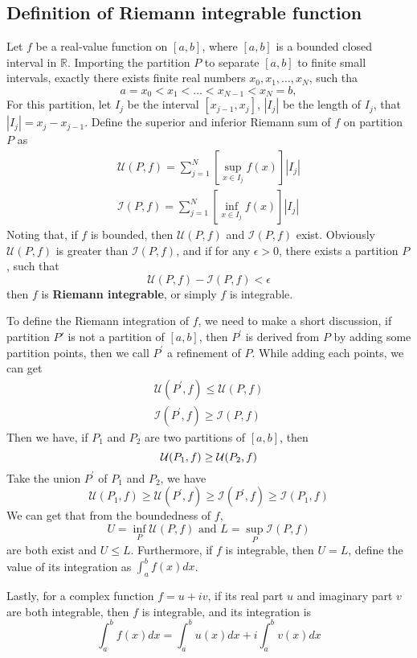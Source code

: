 \documentclass[a4paper]{article}
\numberwithin{equation}{subsection}
\begin{document}
\subsection{Definition of Riemann integrable function}
\par Let $f$ be a real-value function on $[a,b]$, where $[a,b]$ is a bounded closed interval in $\mathbb{R}$. Importing the partition $P$ to separate $[a,b]$ to finite small intervals, exactly there exists finite real numbers $x_0, x_1, \dots, x_N$, such tha
$$a=x_0 < x_1 < \dots < x_{N-1} < x_N=b,$$
For this partition, let $I_j$ be the interval $[x_{j-1},x_j]$, $|I_j|$ be the length of $I_j$, that $|I_j|=x_j-x_{j-1}$. Define the superior and inferior Riemann sum of $f$ on partition $P$ as
\begin{gather}
    \mathcal{U}(P, f) = \sum_{j=1}^N [\sup_{x \in I_j} f(x)]|I_j| \\
    \mathcal{I}(P, f) = \sum_{j=1}^N [\inf_{x \in I_j} f(x)]|I_j|
\end{gather}
Noting that, if $f$ is bounded, then $\mathcal{U}(P, f)$ and $\mathcal{I}(P, f)$ exist. Obviously $\mathcal{U}(P, f)$ is greater than $\mathcal{I}(P, f)$, and if for any $\epsilon>0$, there exists a partition $P$, such that
$$\mathcal{U}(P, f) - \mathcal{I}(P, f) < \epsilon$$
then $f$ is \textbf{Riemann integrable}, or simply $f$ is integrable.
\par To define the Riemann integration of $f$, we need to make a short discussion, if partition $P\prime$ is not a partition of $[a,b]$, then $P^\prime$ is derived from $P$ by adding some partition points, then we call $P^\prime$ a refinement of $P$. While adding each points, we can get
\begin{gather}
    \mathcal{U}(P^\prime, f)\leq\mathcal{U}(P, f) \\
    \mathcal{I}(P^\prime, f)\geq\mathcal{I}(P, f)
\end{gather}
Then we have, if $P_1$ and $P_2$ are two partitions of $[a,b]$, then
\begin{equation}
    \mathcal{U}(P_1, f) \geq \mathcal{U}(P_2, f) \\
\end{equation}
Take the union $P^\prime$ of $P_1$ and $P_2$, we have
\begin{equation}
    \mathcal{U}(P_1, f) \geq \mathcal{U}(P^\prime, f) \geq \mathcal{I}(P^\prime, f) \geq \mathcal{I}(P_1, f)
\end{equation}
We can get that from the boundedness of $f$,
\begin{equation}
    U=\inf_P\mathcal{U}(P, f) \text{ and } L=\sup_P\mathcal{I}(P, f)
\end{equation}
are both exist and $U \leq L$. Furthermore, if $f$ is integrable, then $U=L$, define the value of its integration as $\int_{a}^{b}f(x)dx$.
\par Lastly, for a complex function $f=u+iv$, if its real part $u$ and imaginary part $v$ are both integrable, then $f$ is integrable, and its integration is
\begin{equation}
    \int_{a}^{b}f(x)dx = \int_{a}^{b}u(x)dx + i\int_{a}^{b}v(x)dx
\end{equation}
\end{document}
